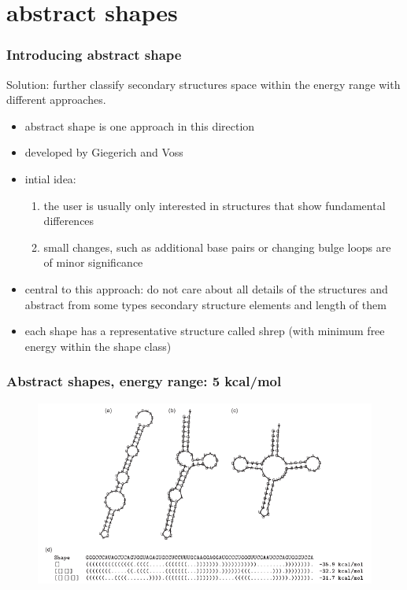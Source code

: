\documentclass[ignorenonframetext,10pt]{beamer}
\begin{document}
\section{abstract shapes}
\begin{frame}
\frametitle{Introducing abstract shape}
    Solution: further classify secondary structures space within the energy range with different approaches.
    \begin{itemize} 
    \item abstract shape is one approach in this direction
    \item developed by Giegerich and Voss
    \item intial idea:
    \begin{enumerate}
      \item the user is usually only interested in structures that show fundamental differences
      \item small changes, such as additional base pairs or changing bulge loops are of minor significance
    \end{enumerate}
    \item central to this approach: do not care about all details of the structures and abstract from some types secondary structure elements and length of them
    \item each shape has a representative structure called shrep (with minimum free energy within the shape class)
    \end{itemize}
\end{frame}


\begin{frame}
\frametitle{Abstract shapes, energy range: 5 kcal/mol}  
\begin{figure}
  \includegraphics[scale=0.6]{images/shapes_example.jpg} 
\end{figure}
\end{frame}
\end{document}
